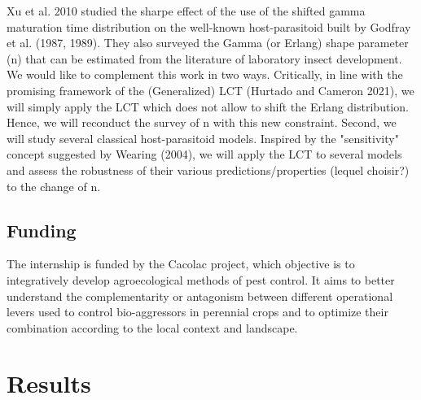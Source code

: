 \documentclass[12pt,a4paper,onecolumn]{article}
\begin{document}
\tabto{1 cm} Xu et al. 2010 studied the sharpe effect of the use of the shifted gamma maturation time distribution on the well-known host-parasitoid built by Godfray et al. (1987, 1989). They also surveyed the Gamma (or Erlang) shape parameter (n) that can be estimated from the literature of laboratory insect development. We would like to complement this work in two ways. Critically, in line with the promising framework of the (Generalized) LCT (Hurtado and Cameron 2021), we will simply apply the LCT which does not allow to shift the Erlang distribution. Hence, we will reconduct the survey of n with this new constraint. Second, we will study several classical host-parasitoid models. Inspired by the "sensitivity" concept suggested by Wearing (2004), we will apply the LCT to several models and assess the robustness of their various predictions/properties (lequel choisir?) to the change of n.

\subsection{Funding}
The internship is funded by the Cacolac project, which objective is to integratively develop agroecological methods of pest control. It aims to better understand the complementarity or antagonism between different operational levers used to control bio-aggressors in perennial crops and to optimize their combination according to the local context and landscape.







\section{Results}
\end{document}
